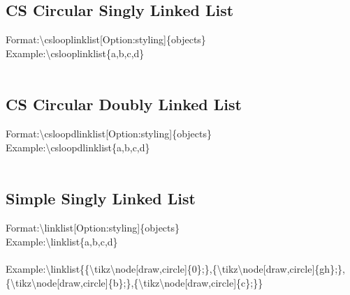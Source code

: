 \documentclass[a4paper]{article}
\begin{document}
\subsection{CS Circular Singly Linked List}
Format:{\textbackslash}cslooplinklist[Option:styling]{\{}objects{\}}\\
Example:{\textbackslash}cslooplinklist{\{}a,b,c,d{\}} \newline \\
\begin{adjustbox}{width=0.5\paperwidth,center,keepaspectratio}
\end{adjustbox}\\
\subsection{CS Circular Doubly Linked List}
Format:{\textbackslash}csloopdlinklist[Option:styling]{\{}objects{\}}\\
Example:{\textbackslash}csloopdlinklist{\{}a,b,c,d{\}} \newline \\
\begin{adjustbox}{width=0.5\paperwidth,center,keepaspectratio}
\end{adjustbox}\\
\subsection{Simple Singly Linked List}
Format:{\textbackslash}linklist[Option:styling]{\{}objects{\}}\\
Example:{\textbackslash}linklist{\{}a,b,c,d{\}} \newline \\
\begin{adjustbox}{width=0.5\paperwidth,center,keepaspectratio}
\end{adjustbox}\\

Example:{\textbackslash}linklist{\{}{\{}{\textbackslash}tikz{\textbackslash}node[draw,circle]{\{}0{\}};{\}},{\{}{\textbackslash}tikz{\textbackslash}node[draw,circle]{\{}gh{\}};{\}},{\{}{\textbackslash}tikz{\textbackslash}node[draw,circle]{\{}b{\}};{\}},{\{}{\textbackslash}tikz{\textbackslash}node[draw,circle]{\{}c{\}};{\}}{\}}\\
\begin{adjustbox}{width=0.5\paperwidth,center,keepaspectratio}
\end{adjustbox}\\
\end{document}
